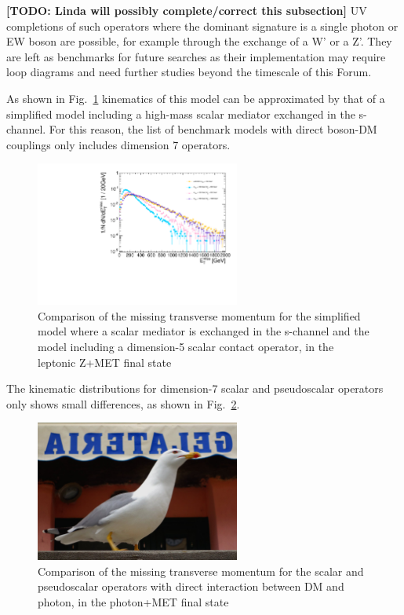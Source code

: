 \textbf{[TODO: Linda will possibly complete/correct this subsection]} UV completions of 
such operators where the dominant signature is a single photon or EW boson are possible, 
for example through the exchange of a W' or a Z'. They are left as benchmarks for future searches as 
their implementation may require loop diagrams and need further studies beyond the timescale of this Forum. 

As shown in Fig.~\ref{fig:EW_EFT5_Zlep_MET}
kinematics of this model can be approximated by that of a simplified model including 
a high-mass scalar mediator exchanged in the s-channel. For this reason, 
the list of benchmark models with direct boson-DM couplings only includes dimension 7 operators. 

\begin{figure}
    \includegraphics[width=0.6\textwidth]{figures/EW/pt_vv2_xxDHDH_vs_ScalarMediator.pdf}
    \caption{Comparison of the missing transverse momentum for the simplified model
    where a scalar mediator is exchanged in the s-channel and the model including 
    a dimension-5 scalar contact operator, in the leptonic Z+MET final state}
    \label{fig:EW_EFT5_Zlep_MET}
\end{figure}

The kinematic distributions for dimension-7 scalar and pseudoscalar operators 
only shows small differences, as shown in Fig.~\ref{fig:EW_EFT5_gamma_MET}. 

\begin{figure}
    \includegraphics[width=0.6\textwidth]{figures/llug}
    \caption{Comparison of the missing transverse momentum for the scalar and pseudoscalar
    operators with direct interaction between DM and photon, in the photon+MET final state}
    \label{fig:EW_EFT5_gamma_MET}
\end{figure}

